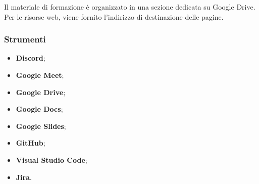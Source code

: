 \vspace{0.5\baselineskip}
\par Il materiale di formazione è organizzato in una sezione dedicata su Google Drive. Per le risorse web, viene fornito l'indirizzo di destinazione delle pagine.

\subsubsection{Strumenti}
\IntroStrumenti
\begin{itemize}
  \item \textbf{Discord};
  \item \textbf{Google Meet};
  \item \textbf{Google Drive};
  \item \textbf{Google Docs};
  \item \textbf{Google Slides};
  \item \textbf{GitHub};
  \item \textbf{Visual Studio Code};
  \item \textbf{Jira}.
\end{itemize}